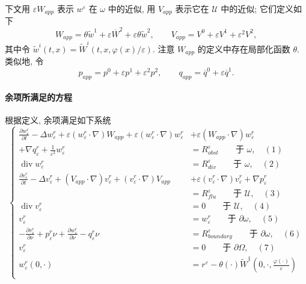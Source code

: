 \begin{sloppypar}
下文用 $\varepsilon W_{app}$ 表示 $w^\varepsilon$ 在 $\omega$ 中的近似, 用 $V_{app}$ 表示它在 $\mathcal U$ 中的近似; 它们定义如下
\[
 W_{app}=\theta\widetilde w^1+\varepsilon\overline W^2+\varepsilon\theta\widetilde w^2,
 \qquad V_{app}=V^0+\varepsilon V^1+\varepsilon^2V^2,
\]
其中令 $\widetilde w^i(t,x)=\widetilde W^i(t,x,\varphi(x)/\varepsilon)$. 注意 $W_{app}$ 的定义中存在局部化函数 $\theta$. 类似地, 令
\[
 p_{app}=p^0+\varepsilon p^1+\varepsilon^2p^2,
 \qquad q_{app}=\overline q^0+\varepsilon\overline q^1.
\]

\paragraph{余项所满足的方程}
\label{subsubsec:chap7-remainder-equations}

根据定义, 余项满足如下系统
\begin{equation}
\left\{
\begin{aligned}
 \frac{\partial w_\varepsilon^r}{\partial t}-\Delta w_\varepsilon^r
 +\varepsilon(w_\varepsilon^r\cdot\nabla)W_{app}
 +\varepsilon(w_\varepsilon^r\cdot\nabla)w_\varepsilon^r
 &+\varepsilon(W_{app}\cdot\nabla)w_\varepsilon^r\\
 +\nabla q_\varepsilon^r+\frac1{\varepsilon^2}w_\varepsilon^r
 &=R_{obst}^\varepsilon\qquad\text{于 }\omega,\quad(1)\\
 \operatorname{div}w_\varepsilon^r&=R_{div}^\varepsilon\qquad\text{于 }\omega,\quad(2)\\
 \frac{\partial v_\varepsilon^r}{\partial t}-\Delta v_\varepsilon^r
 +(V_{app}\cdot\nabla)v_\varepsilon^r+(v_\varepsilon^r\cdot\nabla)V_{app}
 &+\varepsilon(v_\varepsilon^r\cdot\nabla)v_\varepsilon^r+\nabla p_\varepsilon^r\\
 &=R_{flu}^\varepsilon\qquad\text{于 }\mathcal U,\quad(3)\\
 \operatorname{div}v_\varepsilon^r&=0\qquad\text{于 }\mathcal U,\quad(4)\\
 v_\varepsilon^r&=w_\varepsilon^r\qquad\text{于 }\partial\omega,\quad(5)\\
 -\frac{\partial v_\varepsilon^r}{\partial\nu}+p_\varepsilon^r\nu
 +\frac{\partial w_\varepsilon^r}{\partial\nu}-q_\varepsilon^r\nu
 &=R_{boundary}^\varepsilon\qquad\text{于 }\partial\omega,\quad(6)\\
 v_\varepsilon^r&=0\qquad\text{于 }\partial\Omega,\quad(7)\\
 w_\varepsilon^r(0,\cdot)&=r^\varepsilon-\theta(\cdot)\widetilde W^1\left(0,\cdot,\frac{\varphi(\cdot)}\varepsilon\right)\\

\end{aligned}
\end{equation}
\end{sloppypar}
